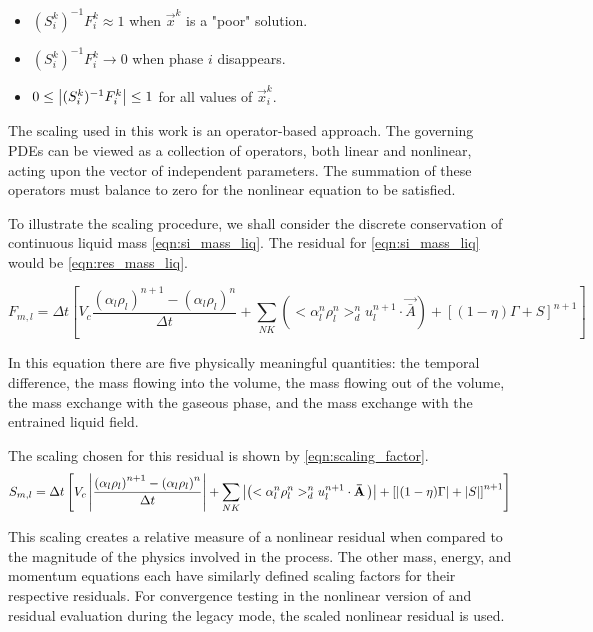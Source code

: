 \begin{itemize}
\item{$(S_{i}^{k})^{-1} F^{k}_i \approx 1$ when $\vec{x}^{k}$ is a "poor" solution.}
\item{$(S_{i}^{k})^{-1} F^{k}_i \rightarrow 0$ when phase $i$ disappears.}
\item{$0 \leq \left|(S_{i}^{k})^{-1} F^{k}_{i}\right| \leq 1 $ for all values of $\vec{x}^{k}_i$.}
\end{itemize}

The scaling used in this work is an operator-based approach.
The governing PDEs can be viewed as a collection of operators, both linear and nonlinear, acting upon the vector of independent parameters.
The summation of these operators must balance to zero for the nonlinear equation to be satisfied.

To illustrate the scaling procedure, we shall consider the discrete conservation of continuous liquid mass \eqref{eqn:si_mass_liq}.
The residual for \eqref{eqn:si_mass_liq} would be \eqref{eqn:res_mass_liq}.

\begin{equation}
\label{eqn:res_mass_liq}
F_{m,l} = \Delta t \left[ V_c \frac{\left(\alpha_l \rho_l \right)^{n+1} - \left(\alpha_l \rho_l \right)^{n}}{\Delta t} + \sum_{NK}\left( <\alpha^n_l \rho^n_l>^{n}_{d} u^{n+1}_l  \cdot \vec{\bar{A}}\right) + \left[(1-\eta)\Gamma + S \right]^{n+1}\right]
\end{equation}

In this equation there are five physically meaningful quantities: the temporal difference, the mass flowing into  the volume, the mass flowing out of the volume, the mass exchange with the gaseous phase, and the mass exchange with the entrained liquid field.

The scaling chosen for this residual is shown by \eqref{eqn:scaling_factor}.
\begin{equation}
\label{eqn:scaling_factor}
S_{m,l} = \Delta t \left[ V_c \abs{\frac{\left(\alpha_l \rho_l \right)^{n+1} - \left(\alpha_l \rho_l \right)^{n}}{\Delta t}} + \sum_{NK}\abs{\left( <\alpha^n_l \rho^n_l>^{n}_{d} u^{n+1}_l  \cdot \vec{\bar{A}}\right)} + \left[\abs{(1-\eta)\Gamma} + \abs{S} \right]^{n+1}\right]
\end{equation}

This scaling creates a relative measure of a nonlinear residual when compared to the magnitude of the physics involved in the process.
The other mass, energy, and momentum equations each have similarly defined scaling factors for their respective residuals.
For convergence testing in the nonlinear version of \cobra{} and residual evaluation during the legacy mode, the scaled nonlinear residual is used.

